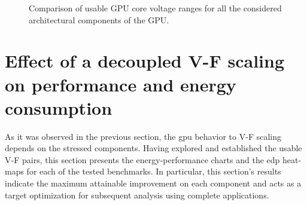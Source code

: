 \begin{figure}
    \centering
    \begin{subfigmatrix}{2}
      \label{fig:Comparison_Guardband}
    \end{subfigmatrix}
    \caption{Comparison of usable GPU core voltage ranges for all the considered architectural components of the GPU.}
\end{figure}


\clearpage

\section{Effect of a decoupled V-F scaling on performance and energy consumption}
\label{sec:gpu_behaviour}


As it was observed in the previous section, the \acrshort{gpu} behavior to V-F scaling depends on the stressed components. Having explored and established the usable V-F  pairs, this section presents the energy-performance charts and the \acrshort{edp} heat-maps for each of the tested benchmarks. In particular, this section's results indicate the maximum attainable improvement on each component and acts as a target optimization for subsequent analysis using complete applications. 



